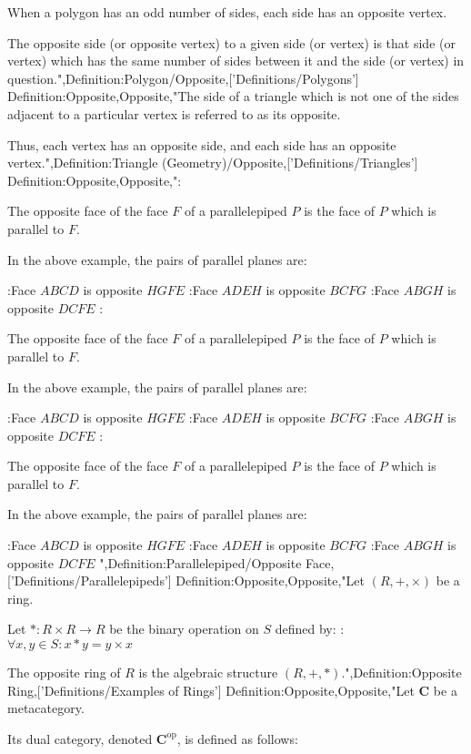 When a polygon has an odd number of sides, each side has an opposite vertex.


The opposite side (or opposite vertex) to a given side (or vertex) is that side (or vertex) which has the same number of sides between it and the side (or vertex) in question.",Definition:Polygon/Opposite,['Definitions/Polygons']
Definition:Opposite,Opposite,"The side of a triangle which is not one of the sides adjacent to a particular vertex is referred to as its opposite.

Thus, each vertex has an opposite side, and each side has an opposite vertex.",Definition:Triangle (Geometry)/Opposite,['Definitions/Triangles']
Definition:Opposite,Opposite,":

The opposite face of the face $F$ of a parallelepiped $P$ is the face of $P$ which is parallel to $F$.

In the above example, the pairs of parallel planes are:

:Face $ABCD$ is opposite $HGFE$
:Face $ADEH$ is opposite $BCFG$
:Face $ABGH$ is opposite $DCFE$
:

The opposite face of the face $F$ of a parallelepiped $P$ is the face of $P$ which is parallel to $F$.

In the above example, the pairs of parallel planes are:

:Face $ABCD$ is opposite $HGFE$
:Face $ADEH$ is opposite $BCFG$
:Face $ABGH$ is opposite $DCFE$
:

The opposite face of the face $F$ of a parallelepiped $P$ is the face of $P$ which is parallel to $F$.

In the above example, the pairs of parallel planes are:

:Face $ABCD$ is opposite $HGFE$
:Face $ADEH$ is opposite $BCFG$
:Face $ABGH$ is opposite $DCFE$
",Definition:Parallelepiped/Opposite Face,['Definitions/Parallelepipeds']
Definition:Opposite,Opposite,"Let $\left( R, +, \times \right)$ be a ring.


Let $* : R \times R \to R$ be the binary operation on $S$ defined by:
:$\forall x, y \in S: x * y = y \times x$

The opposite ring of $R$ is the algebraic structure $\left( R, +, * \right)$.",Definition:Opposite Ring,['Definitions/Examples of Rings']
Definition:Opposite,Opposite,"Let $\mathbf C$ be a metacategory.


Its dual category, denoted $\mathbf C^{\text{op} }$, is defined as follows:



